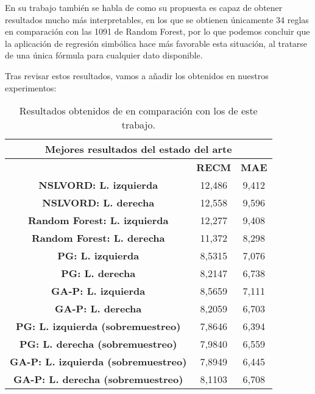 En su trabajo también se habla de como su propuesta es capaz de obtener resultados mucho más interpretables, en los que se obtienen únicamente 34 reglas en comparación con las 1091 de Random Forest, por lo que podemos concluir que la aplicación de regresión simbólica hace más favorable esta situación, al tratarse de una única fórmula para cualquier dato disponible.

Tras revisar estos resultados, vamos a añadir los obtenidos en nuestros experimentos:


\begin{table}[H]
\centering
\begin{tabular}{|c|c|c|}
\hline
\multicolumn{3}{|c|}{\textbf{Mejores resultados del estado del arte}}        \\ \hline
\textbf{}                                     & \textbf{RECM} & \textbf{MAE} \\ \hline
\textbf{NSLVORD: L. izquierda}                & 12,486        & 9,412        \\ \hline
\textbf{NSLVORD: L. derecha}                  & 12,558        & 9,596        \\ \hline
\textbf{Random Forest: L. izquierda}          & 12,277        & 9,408        \\ \hline
\textbf{Random Forest: L. derecha}            & 11,372        & 8,298        \\ \hline
\textbf{PG: L. izquierda}                     & 8,5315        & 7,076        \\ \hline
\textbf{PG: L. derecha}                       & 8,2147        & 6,738        \\ \hline
\textbf{GA-P: L. izquierda}                   & 8,5659        & 7,111        \\ \hline
\textbf{GA-P: L. derecha}                     & 8,2059        & 6,703        \\ \hline
\textbf{PG: L. izquierda (sobremuestreo)}     & 7,8646        & 6,394        \\ \hline
\textbf{PG: L. derecha (sobremuestreo)}       & 7,9840        & 6,559        \\ \hline
\textbf{GA-P: L. izquierda (sobremuestreo)}   & 7,8949        & 6,445        \\ \hline
\textbf{GA-P: L. derecha (sobremuestreo)}     & 8,1103        & 6,708        \\ \hline
\end{tabular}%
\caption{Resultados obtenidos de \cite{NSLVOrdAge} en comparación con los de este trabajo.}\label{table:cmp_estado_arte}
\end{table}

